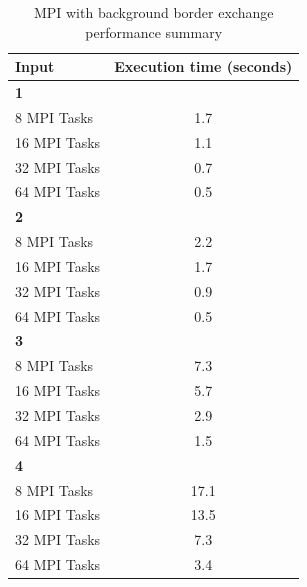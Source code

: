 \documentclass{article}
\begin{document}
\begin{table}[htbp]
  \centering
  \caption{MPI with background border exchange performance summary}
  \label{tab:mpi_performance_bg}
  \begin{tabular}{lc}
    \toprule
    \textbf{Input} & \textbf{Execution time (seconds)}\\
    \midrule
    \textbf{1} & \\
    8 MPI Tasks & 1.7 \\
    16 MPI Tasks & 1.1 \\
    32 MPI Tasks & 0.7 \\
    64 MPI Tasks & 0.5 \\
    \midrule
    \textbf{2} & \\
    8 MPI Tasks & 2.2 \\
    16 MPI Tasks & 1.7 \\
    32 MPI Tasks & 0.9 \\
    64 MPI Tasks & 0.5 \\
    \midrule
    \textbf{3} & \\
    8 MPI Tasks & 7.3 \\
    16 MPI Tasks & 5.7 \\
    32 MPI Tasks & 2.9 \\
    64 MPI Tasks & 1.5 \\
    \midrule
    \textbf{4} & \\
    8 MPI Tasks & 17.1 \\
    16 MPI Tasks & 13.5 \\
    32 MPI Tasks & 7.3 \\
    64 MPI Tasks & 3.4 \\
    \bottomrule
  \end{tabular}
\end{table}
\end{document}
